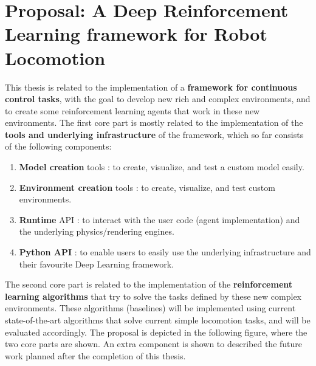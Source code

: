
\chapter{Proposal: A Deep Reinforcement Learning framework for Robot Locomotion}
\label{ch:proposal}



This thesis is related to the implementation of a \textbf{framework for continuous control
tasks}, with the goal to develop new rich and complex environments, and to create some 
reinforcement learning agents that work in these new environments. 
The first core part is mostly related to the implementation of the \textbf{tools and underlying
infrastructure} of the framework, which so far consists of the following components:

\begin{enumerate}
    \item \textbf{Model creation} tools : to create, visualize, and test a custom model easily.
    \item \textbf{Environment creation} tools : to create, visualize, and test custom environments.
    \item \textbf{Runtime} API : to interact with the user code (agent implementation) and the underlying physics/rendering engines.
    \item \textbf{Python API} : to enable users to easily use the underlying infrastructure and their favourite Deep Learning framework.
\end{enumerate}

The second core part is related to the implementation of the \textbf{reinforcement learning algorithms}
that try to solve the tasks defined by these new complex environments. These algorithms (baselines) will be implemented
using current state-of-the-art algorithms that solve current simple locomotion tasks, and will be evaluated
accordingly. The proposal is depicted in the following figure, where the two core parts are shown. An extra
component is shown to described the future work planned after the completion of this thesis.

